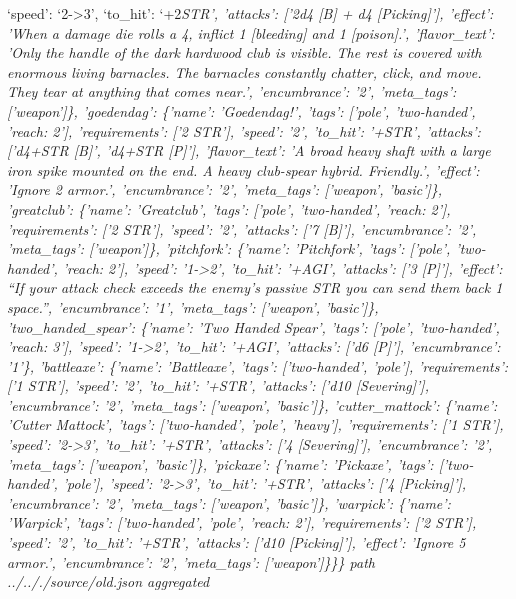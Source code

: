 \documentclass[
  letterpaper,
  DIV=11,
  numbers=noendperiod]{scrartcl}
\begin{document}
`speed': `2-\textgreater3', `to\_hit': `+2\emph{STR', 'attacks': {[}'2d4
{[}B{]} + d4 {[}Picking{]}'{]}, 'effect': 'When a damage die rolls a 4,
inflict 1 {[}bleeding{]} and 1 {[}poison{]}.', 'flavor\_text': 'Only the
handle of the dark hardwood club is visible. The rest is covered with
enormous living barnacles. The barnacles constantly chatter, click, and
move. They tear at anything that comes near.', 'encumbrance': '2',
'meta\_tags': {[}'weapon'{]}\}, 'goedendag': \{'name': 'Goedendag!',
'tags': {[}'pole', 'two-handed', 'reach: 2'{]}, 'requirements': {[}'2
STR'{]}, 'speed': '2', 'to\_hit': '+STR', 'attacks': {[}'d4+STR
{[}B{]}', 'd4+STR {[}P{]}'{]}, 'flavor\_text': 'A broad heavy shaft with
a large iron spike mounted on the end. A heavy club-spear hybrid.
Friendly.', 'effect': 'Ignore 2 armor.', 'encumbrance': '2',
'meta\_tags': {[}'weapon', 'basic'{]}\}, 'greatclub': \{'name':
'Greatclub', 'tags': {[}'pole', 'two-handed', 'reach: 2'{]},
'requirements': {[}'2 STR'{]}, 'speed': '2', 'attacks': {[}'7
{[}B{]}'{]}, 'encumbrance': '2', 'meta\_tags': {[}'weapon'{]}\},
'pitchfork': \{'name': 'Pitchfork', 'tags': {[}'pole', 'two-handed',
'reach: 2'{]}, 'speed': '1-\textgreater2', 'to\_hit': '+AGI', 'attacks':
{[}'3 {[}P{]}'{]}, 'effect': ``If your attack check exceeds the enemy's
passive STR you can send them back 1 space.'', 'encumbrance': '1',
'meta\_tags': {[}'weapon', 'basic'{]}\}, 'two\_handed\_spear': \{'name':
'Two Handed Spear', 'tags': {[}'pole', 'two-handed', 'reach: 3'{]},
'speed': '1-\textgreater2', 'to\_hit': '+AGI', 'attacks': {[}'d6
{[}P{]}'{]}, 'encumbrance': '1'\}, 'battleaxe': \{'name': 'Battleaxe',
'tags': {[}'two-handed', 'pole'{]}, 'requirements': {[}'1 STR'{]},
'speed': '2', 'to\_hit': '+STR', 'attacks': {[}'d10 {[}Severing{]}'{]},
'encumbrance': '2', 'meta\_tags': {[}'weapon', 'basic'{]}\},
'cutter\_mattock': \{'name': 'Cutter Mattock', 'tags': {[}'two-handed',
'pole', 'heavy'{]}, 'requirements': {[}'1 STR'{]}, 'speed':
'2-\textgreater3', 'to\_hit': '+STR', 'attacks': {[}'4
{[}Severing{]}'{]}, 'encumbrance': '2', 'meta\_tags': {[}'weapon',
'basic'{]}\}, 'pickaxe': \{'name': 'Pickaxe', 'tags': {[}'two-handed',
'pole'{]}, 'speed': '2-\textgreater3', 'to\_hit': '+STR', 'attacks':
{[}'4 {[}Picking{]}'{]}, 'encumbrance': '2', 'meta\_tags': {[}'weapon',
'basic'{]}\}, 'warpick': \{'name': 'Warpick', 'tags': {[}'two-handed',
'pole', 'reach: 2'{]}, 'requirements': {[}'2 STR'{]}, 'speed': '2',
'to\_hit': '+STR', 'attacks': {[}'d10 {[}Picking{]}'{]}, 'effect':
'Ignore 5 armor.', 'encumbrance': '2', 'meta\_tags':
{[}'weapon'{]}\}\}\} path ../.././source/old.json aggregated
}
\end{document}

